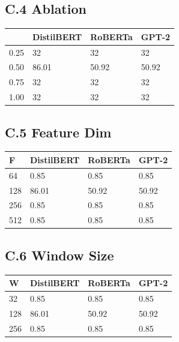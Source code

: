 \subsection{C.4   Ablation}

\begin{table}[H]
\centering
\small
\begin{tabular}{llll}
\toprule
\textbf{} & \textbf{DistilBERT} & \textbf{RoBERTa} & \textbf{GPT-2} \\
\midrule
0.25 & 32 & 32 & 32 \\
0.50 & 86.01 & 50.92 & 50.92 \\
0.75 & 32 & 32 & 32 \\
1.00 & 32 & 32 & 32 \\
\bottomrule
\end{tabular}
\end{table}

\subsection{C.5 Feature Dim}

\begin{table}[H]
\centering
\small
\begin{tabular}{llll}
\toprule
\textbf{F} & \textbf{DistilBERT} & \textbf{RoBERTa} & \textbf{GPT-2} \\
\midrule
64 & 0.85 & 0.85 & 0.85 \\
128 & 86.01 & 50.92 & 50.92 \\
256 & 0.85 & 0.85 & 0.85 \\
512 & 0.85 & 0.85 & 0.85 \\
\bottomrule
\end{tabular}
\end{table}

\subsection{C.6 Window Size}

\begin{table}[H]
\centering
\small
\begin{tabular}{llll}
\toprule
\textbf{W} & \textbf{DistilBERT} & \textbf{RoBERTa} & \textbf{GPT-2} \\
\midrule
32 & 0.85 & 0.85 & 0.85 \\
128 & 86.01 & 50.92 & 50.92 \\
256 & 0.85 & 0.85 & 0.85 \\
\bottomrule
\end{tabular}
\end{table}

